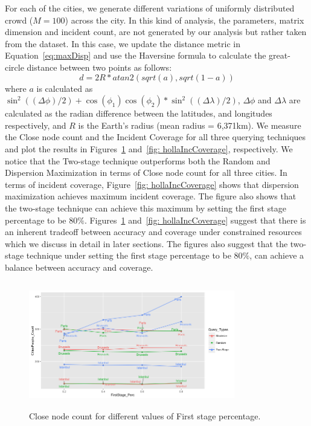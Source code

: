 \documentclass{acm_proc_article-sp}
\begin{document}
For each of the cities, we generate different variations of uniformly distributed crowd ($M = 100$) across the city. In this kind of analysis, the parameters, matrix dimension and incident count, are not generated by our analysis but rather taken from the dataset. In this case, we update the distance metric in Equation~\ref{eq:maxDisp} and use the Haversine formula to calculate the great-circle distance between two points as follows:
\begin{equation} \label{eq:maxDisp2}
d = 2R*atan2(sqrt(a), sqrt(1-a))
\end{equation}
where $a$ is calculated as $ \sin ^2((\Delta \phi)/2 ) + \cos(\phi_1)\cos(\phi_2) * \sin ^2((\Delta \lambda)/2 )$, $\Delta \phi$ and $\Delta \lambda$ are calculated as the radian difference between the latitudes, and longitudes respectively, and $R$ is the Earth's radius (mean radius = 6,371km). We measure the Close node count and the Incident Coverage for all three querying techniques and plot the results in Figures~\ref{fig: hollaCloseCount} and~\ref{fig: hollaIncCoverage}, respectively. We notice that the Two-stage technique outperforms both the Random and Dispersion Maximization in terms of Close node count for all three cities. In terms of incident coverage, Figure~\ref{fig: hollaIncCoverage} shows that dispersion maximization achieves maximum incident coverage. The figure also shows that the two-stage technique can achieve this maximum by setting the first stage percentage to be $80\%$. Figures~\ref{fig: hollaCloseCount} and~\ref{fig: hollaIncCoverage} suggest that there is an inherent tradeoff between accuracy and coverage under constrained resources which we discuss in detail in later sections. The figures also suggest that the two-stage technique under setting the first stage percentage to be $80\%$, can achieve a balance between accuracy and coverage.\par
\begin{figure}[!h]
\centering
 \includegraphics[width=9cm ,height=5.5cm]{figuresPng/hollaCloseCnt.png}
 \caption{Close node count for different values of First stage percentage. }
 \label{fig: hollaCloseCount}
\end{figure}
\end{document}
